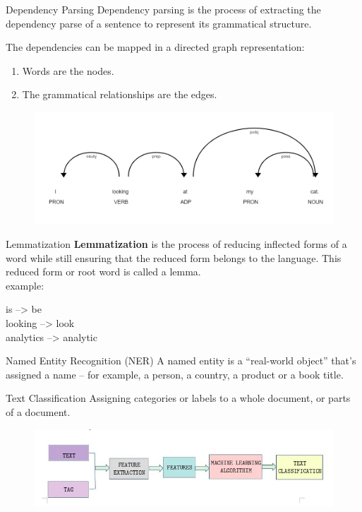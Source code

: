 \documentclass{beamer}
\begin{document}
	\begin{frame}[t]{Dependency Parsing}
		Dependency parsing is the process of extracting the dependency parse of a sentence to represent its grammatical structure.
		
		The dependencies can be mapped in a directed graph representation:
		\begin{enumerate}
			\item Words are the nodes.
			\item The grammatical relationships are the edges.
		\end{enumerate}
		\begin{figure}
			\centering
			\includegraphics[scale=0.3]{depen.png}
		\end{figure}
	\end{frame}

	\begin{frame}[t]{Lemmatization}
		\textbf{Lemmatization} is the process of reducing inflected forms of a word while still ensuring that the reduced form belongs to the language. This reduced form or root word is called a lemma.\\
		
		example:
		
		is --> be\\
		looking --> look\\
		analytics --> analytic
	\end{frame}

	\begin{frame}[t]{Named Entity Recognition (NER)}
		A named entity is a “real-world object” that’s assigned a name – for example, a person, a country, a product or a book title.
	\end{frame}

	\begin{frame}[t]{Text Classification}
		Assigning categories or labels to a whole document, or parts of a document.
		\begin{figure}
			\centering
			\includegraphics[scale=0.4]{text-classification-python-spacy.png}
		\end{figure}
	\end{frame}
\end{document}
